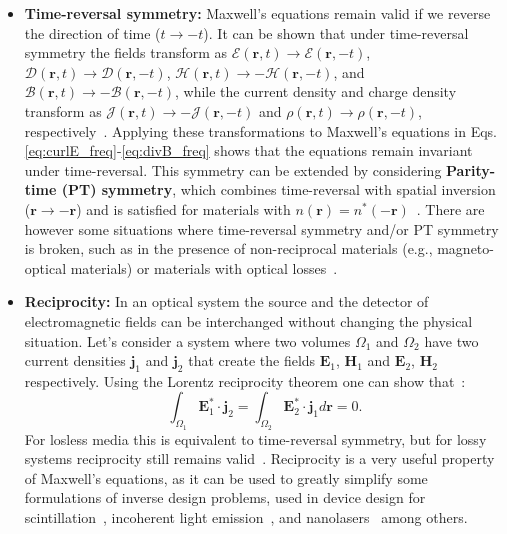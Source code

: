 \begin{itemize}
        \item \textbf{Time-reversal symmetry:} Maxwell's equations remain valid if
              we reverse the direction of time ($t\to-t$). It can be shown that under
              time-reversal symmetry
              the fields transform as
              $\bm{\mathcal{E}}(\mathbf{r}, t)\to\bm{\mathcal{E}}(\mathbf{r}, -t)$,
              $\bm{\mathcal{D}}(\mathbf{r}, t)\to\bm{\mathcal{D}}(\mathbf{r}, -t)$,
              $\bm{\mathcal{H}}(\mathbf{r},
                  t)\to-\bm{\mathcal{H}}(\mathbf{r}, -t)$, and $\bm{\mathcal{B}}(\mathbf{r},
                  t)\to-\bm{\mathcal{B}}(\mathbf{r}, -t)$, while the current density and charge
              density transform as
              $\bm{\mathcal{J}}(\mathbf{r},
                  t)\to-\bm{\mathcal{J}}(\mathbf{r}, -t)$ and $\bm{\mathcal{\rho}}(\mathbf{r},
                  t)\to\bm{\mathcal{\rho}}(\mathbf{r}, -t)$, respectively~\cite{reciprocity}.
              Applying these transformations
              to Maxwell's equations in Eqs. \eqref{eq:curlE_freq}-\eqref{eq:divB_freq} shows
              that the equations remain invariant under time-reversal. This
              symmetry can be extended by
              considering \textbf{Parity-time (PT) symmetry}, which combines time-reversal
              with spatial inversion ($\mathbf{r}\to-\mathbf{r}$) and is satisfied for
              materials with $n(\mathbf{r}) = n^*(-\mathbf{r})$~\cite{pt}. There
              are however some situations where time-reversal symmetry and/or PT symmetry is
              broken,
              such as in the presence of
              non-reciprocal materials (e.g., magneto-optical materials) or materials with
              optical losses~\cite{ownpub0}.

        \item \textbf{Reciprocity:} In an optical system the source and the
              detector of electromagnetic fields can be interchanged without changing the
              physical situation. Let's consider a system where two volumes $\Omega_1$ and
              $\Omega_2$
              have two current densities $\mathbf{j}_1$ and $\mathbf{j}_2$ that create
              the fields $\mathbf{E}_1$, $\mathbf{H}_1$ and $\mathbf{E}_2$, $\mathbf{H}_2$
              respectively. Using the Lorentz reciprocity theorem one can show
              that~\cite{novotny}:
              \begin{equation}
                  \int_{\Omega_1} \mathbf{E}_1^* \cdot \mathbf{j}_2 = \int_{\Omega_2}
                  \mathbf{E}_2^* \cdot \mathbf{j}_1 d\mathbf{r} = 0.
              \end{equation}
              For losless media this is equivalent to time-reversal symmetry, but for
              lossy systems reciprocity still remains valid~\cite{Carminati:98}. Reciprocity
              is a very useful property of Maxwell's equations, as it can be used to
              greatly simplify some formulations of inverse design problems, used in device design for
              scintillation~\cite{Roques_Carmes_2022}, incoherent light emission~\cite{LED_opt, Yao_2022}, and nanolasers~\cite{ownpub4} among others.
    \end{itemize}

